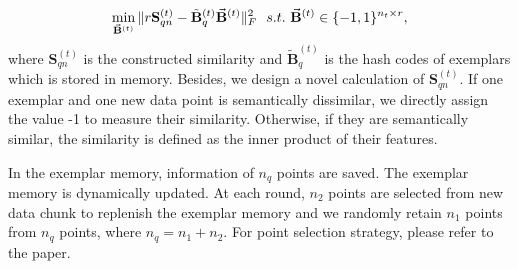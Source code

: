 \documentclass[final]{beamer}
\newlength{\colwidth}
\begin{document}
\begin{frame}[t]
\begin{columns}[t]
\begin{column}{\colwidth}
					\vspace{-3mm}
					\begin{equation}
						\begin{aligned}
							\min_{\vec{\mathbf{B}}^{(t)}} \| r\mathbf{S}_{qn}^{(t)} - \tilde{\mathbf{B}}^{(t)}_{q}\vec{\mathbf{B}}^{(t)} \|_{F}^{2}  \ \ 
							s.t. \ \vec{\mathbf{B}}^{(t)} \in \{-1,1\}^{n_{t} \times r},
						\end{aligned}
						\label{memory-newdata}
						\vspace{-1mm}
					\end{equation}
					where $\mathbf{S}_{qn}^{(t)}$ is the constructed similarity and $\tilde{\mathbf{B}}^{(t)}_{q}$ is the hash codes of exemplars which is stored in memory. Besides, we design a novel calculation of $\mathbf{S}_{qn}^{(t)}$. If one exemplar and one new data point is semantically dissimilar, we directly assign the value -1 to measure their similarity. Otherwise, if they are semantically similar, the similarity is defined as the inner product of their features.
					
					In the exemplar memory, information of $n_{q}$ points are saved. The exemplar memory is dynamically updated. At each round, $n_{2}$ points are selected from new data chunk to replenish the exemplar memory and we randomly retain $n_{1}$ points from $n_{q}$ points, where $n_{q}= n_{1}+ n_{2}$. For point selection strategy, please refer to the paper.



\end{column}
\end{columns}
\end{frame}
\end{document}
